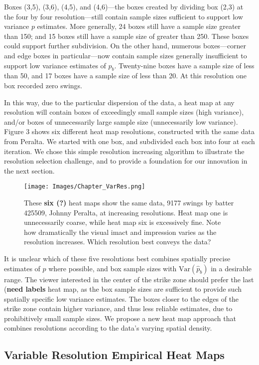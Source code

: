 \documentclass{article}
\begin{document}
Boxes (3,5), (3,6), (4,5), and (4,6)---the boxes created by dividing box (2,3) at the four by four resolution---still contain sample sizes sufficient to support low variance $p$ estimates. More generally, 24 boxes still have a sample size greater than 150; and 15 boxes still have a sample size of greater than 250. These boxes could support further subdivision. On the other hand, numerous boxes---corner and edge boxes in particular---now contain sample sizes generally insufficient to support low variance estimates of $p_{b}$. Twenty-nine boxes have a sample size of less than 50, and 17 boxes have a sample size of less than 20. At this resolution one box recorded zero swings.

In this way, due to the particular dispersion of the data, a heat map at any resolution will contain boxes of exceedingly small sample sizes (high variance), and/or boxes of unnecessarily large sample size (unnecessarily low variance). Figure 3 shows six different heat map resolutions, constructed with the same data from Peralta. We started with one box, and subdivided each box into four at each iteration. We chose this simple resolution increasing algorithm to illustrate the resolution selection challenge, and to provide a foundation for our innovation in the next section. 
        \begin{figure}[H]
      	\centering
      	\texttt{[image: Images/Chapter\_VarRes.png]} 
      	\caption{These {\bf six (?)} heat maps show the same data, 9177 swings by batter 425509, Johnny Peralta, at increasing resolutions. Heat map one is unnecessarily coarse, while heat map six is excessively fine. Note how dramatically the visual imact and impression varies as the resolution increases. Which resolution best conveys the data?}
      	\end{figure} 

It is unclear which of these five resolutions best combines spatially precise estimates of $p$ where possible, and box sample sizes with $\text{Var}(\hat{p}_{b})$ in a desirable range. The viewer interested in the center of the strike zone should prefer the last ({\bf need labels} heat map, as the box sample sizes are sufficient to provide such spatially specific low variance estimates. The boxes closer to the edges of the strike zone contain higher variance, and thus less reliable estimates, due to prohibitively small sample sizes. We propose a new heat map approach that combines resolutions according to the data's varying spatial density.

\subsection{Variable Resolution Empirical Heat Maps} %
\end{document}
